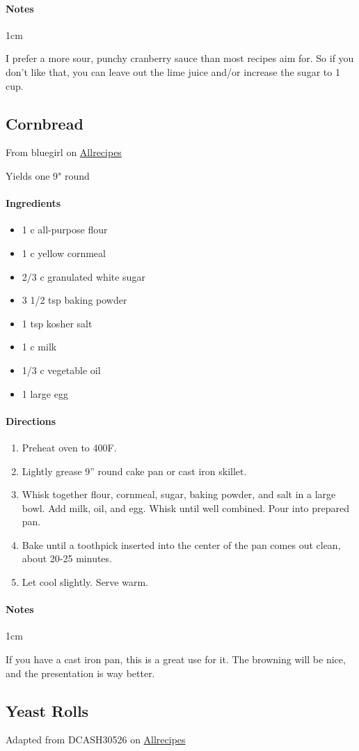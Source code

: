 \documentclass[12pt]{article}
\newenvironment*{ingredients}
	{
		\paragraph*{Ingredients}
		\begin{itemize}
	}
	{
		\end{itemize}
	}
\newenvironment*{directions}
	{
		\paragraph*{Directions}
		\begin{enumerate}
	}
	{
		\end{enumerate}
	}
\newenvironment*{notes}
	{
		\paragraph*{Notes}
		\begin{adjustwidth}{1cm}{}
	}
	{
		\end{adjustwidth}
	}
\begin{document}
	\begin{notes}
		I prefer a more sour, punchy cranberry sauce than most recipes aim for. So if you don't like that, you can leave out the lime juice and/or increase the sugar to 1 cup.
	\end{notes}
	
	\newpage
	
	\subsection{Cornbread}\label{sec:cornbread}
	From bluegirl on \href{https://www.allrecipes.com/recipe/17891/golden-sweet-cornbread/}{Allrecipes}
	
	Yields one 9" round
	
	\begin{ingredients}
		\item 1 c all-purpose flour
		\item 1 c yellow cornmeal
		\item 2/3 c granulated white sugar
		\item 3 1/2 tsp baking powder
		\item 1 tsp kosher salt
		\item 1 c milk
		\item 1/3 c vegetable oil
		\item 1 large egg
	\end{ingredients}
	
	\begin{directions}
		\item Preheat oven to 400F.
		\item Lightly grease 9” round cake pan or cast iron skillet.
		\item Whisk together flour, cornmeal, sugar, baking powder, and salt in a large bowl. Add milk, oil, and egg. Whisk until well combined. Pour into prepared pan.
		\item Bake until a toothpick inserted into the center of the pan comes out clean, about 20-25 minutes.
		\item Let cool slightly. Serve warm.
	\end{directions}
	
	\begin{notes}
		If you have a cast iron pan, this is a great use for it. The browning will be nice, and the presentation is way better.
	\end{notes}
	
	\newpage
	
	\subsection{Yeast Rolls}
	Adapted from DCASH30526 on \href{https://www.allrecipes.com/recipe/13827/quick-yeast-rolls/}{Allrecipes}
	
\end{document}
